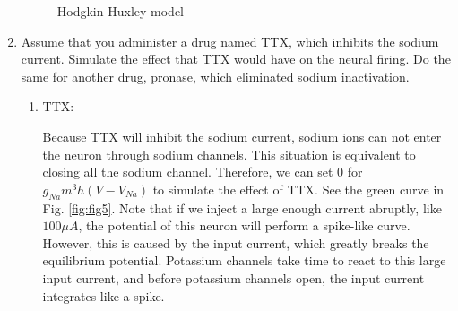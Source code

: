 \documentclass[11pt]{article}
\begin{document}
\begin{enumerate}
		\begin{figure}[ht]
			\centering
			\caption{Hodgkin-Huxley model}
		\end{figure}
		
		\item Assume that you administer a drug named TTX, which inhibits the sodium current. Simulate the effect that TTX would have on the neural firing. Do the same for another drug, pronase, which eliminated sodium inactivation.
		\label{P6}
		
		\begin{enumerate}
		    \item TTX:
		
    		Because TTX will inhibit the sodium current, sodium ions can not enter the neuron through sodium channels. This situation is equivalent to closing all the sodium channel. Therefore, we can set 0 for $g_{Na}m^3h(V-V_{Na})$ to simulate the effect of TTX. See the green curve in Fig. \ref{fig:fig5}. Note that if we inject a large enough current abruptly, like $100 \mu A$, the potential of this neuron will perform a spike-like curve. However, this is caused by the input current, which greatly breaks the equilibrium potential. Potassium channels take time to react to this large input current, and before potassium channels open, the input current integrates like a spike.
    		

\end{enumerate}
\end{enumerate}
\end{document}
